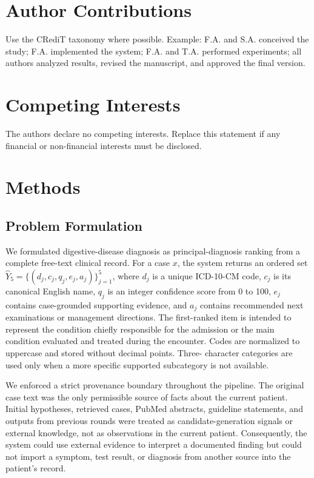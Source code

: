 \documentclass[10pt,letterpaper]{article}
\begin{document}
\section{Author Contributions}

Use the CRediT taxonomy where possible. Example: F.A. and S.A. conceived the
study; F.A. implemented the system; F.A. and T.A. performed experiments; all
authors analyzed results, revised the manuscript, and approved the final version.

\section{Competing Interests}

The authors declare no competing interests. Replace this statement if any
financial or non-financial interests must be disclosed.

\section{Methods}

\subsection{Problem Formulation}

We formulated digestive-disease diagnosis as principal-diagnosis ranking from a
complete free-text clinical record. For a case $x$, the system returns an ordered
set $\widehat{Y}_{5}=\{(d_j,c_j,q_j,e_j,a_j)\}_{j=1}^{5}$, where $d_j$ is a
unique ICD-10-CM code, $c_j$ is its canonical English name, $q_j$ is an integer
confidence score from 0 to 100, $e_j$ contains case-grounded supporting evidence,
and $a_j$ contains recommended next examinations or management directions. The
first-ranked item is intended to represent the condition chiefly responsible for
the admission or the main condition evaluated and treated during the encounter.
Codes are normalized to uppercase and stored without decimal points. Three-
character categories are used only when a more specific supported subcategory is
not available.

We enforced a strict provenance boundary throughout the pipeline. The original
case text was the only permissible source of facts about the current patient.
Initial hypotheses, retrieved cases, PubMed abstracts, guideline statements, and
outputs from previous rounds were treated as candidate-generation signals or
external knowledge, not as observations in the current patient. Consequently,
the system could use external evidence to interpret a documented finding but
could not import a symptom, test result, or diagnosis from another source into
the patient's record.
\end{document}
